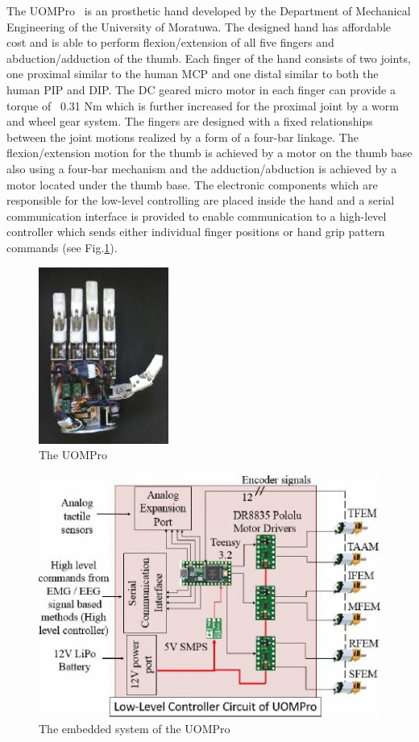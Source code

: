 \documentclass[a4paper, 10pt, conference]{ieeeconf}      %
\begin{document}
The UOMPro~\cite{uompro} is an prosthetic hand developed by the Department of Mechanical Engineering of the University of Moratuwa. The designed hand has affordable cost and is able to perform flexion/extension of all five fingers and abduction/adduction of the thumb. Each finger of the hand consists of two joints, one proximal similar to the human MCP and one distal similar to both the human PIP and DIP. The DC geared micro motor in each finger can provide a torque of ~0.31 Nm which is further increased for the proximal joint by a worm and wheel gear system. The fingers are designed with a fixed relationships between the joint motions realized by a form of a four-bar linkage. The flexion/extension motion for the thumb is achieved by a motor on the thumb base also using a four-bar mechanism and the adduction/abduction is achieved by a motor located under the thumb base. The electronic components which are responsible for the low-level controlling are placed inside the hand and a serial communication interface is provided to enable communication to a high-level controller which sends either individual finger positions or hand grip pattern commands (see Fig.\ref{fig:embuompro}).

\begin{figure}[h]

	\centering
	\includegraphics[scale=1.0]{images/UOMPro}
	
	\caption{The UOMPro}
\end{figure}

\begin{figure}[h]

	\centering
	\includegraphics[scale=0.7]{images/UOMPro2}
	
	\caption{The embedded system of the UOMPro}
	\label{fig:embuompro}
\end{figure}
\end{document}
